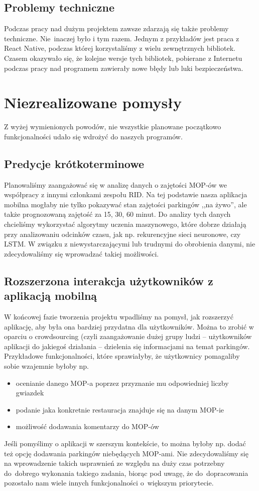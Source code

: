 \subsection{Problemy techniczne}
Podczas pracy nad dużym projektem zawsze zdarzają się także problemy techniczne. Nie~inaczej było i tym razem. 
Jednym z przykładów jest praca z React Native, podczas której korzystaliśmy z wielu zewnętrznych bibliotek. Czasem okazywało się, że kolejne wersje tych bibliotek, pobierane z Internetu podczas pracy nad programem zawierały nowe błędy lub luki bezpieczeństwa.

\section{Niezrealizowane pomysły}
Z wyżej wymienionych powodów, nie wszystkie planowane początkowo funkcjonalności udało się wdrożyć do naszych programów.
\subsection{Predycje krótkoterminowe}
Planowaliśmy zaangażować się w analizę danych o zajętości MOP-ów we współpracy z innymi członkami zespołu RID. Na tej podstawie nasza aplikacja mobilna mogłaby nie tylko pokazywać stan zajętości parkingów ,,na żywo'', ale także prognozowaną zajętość za 15, 30, 60 minut. Do analizy tych danych chcieliśmy wykorzystać algorytmy uczenia maszynowego, które dobrze działają przy analizowaniu odcinków czasu, jak np. rekurencyjne sieci neuronowe, czy LSTM. W związku z niewystarczającymi lub trudnymi do obrobienia danymi, nie zdecydowaliśmy się wprowadzać takiej możliwości.
\subsection{Rozszerzona interakcja użytkowników z aplikacją mobilną}
W końcowej fazie tworzenia projektu wpadliśmy na pomysł, jak rozszerzyć aplikację, aby była ona bardziej przydatna dla użytkowników. Można to zrobić w oparciu o crowdsourcing (czyli zaangażowanie dużej grupy ludzi -- użytkowników aplikacji do jakiegoś działania -- dzielenia się informacjami na temat parkingów. Przykładowe funkcjonalności, które sprawiałyby, że użytkownicy pomagaliby sobie wzajemnie byłoby np.
\begin{itemize}
\item ocenianie danego MOP-a poprzez przyznanie mu odpowiedniej liczby gwiazdek
\item podanie jaka konkretnie restauracja znajduje się na danym MOP-ie
\item możliwość dodawania komentarzy do MOP-ów
\end{itemize}
Jeśli pomyślimy o aplikacji w szerszym kontekście, to można byłoby np. dodać też opcję dodawania parkingów niebędących MOP-ami.
Nie zdecydowaliśmy się na wprowadzenie takich usprawnień ze względu na duży czas potrzebny do~dobrego wykonania takiego zadania, biorąc pod uwagę, że do~dopracowania pozostało nam wiele innych funkcjonalności o~większym priorytecie.
